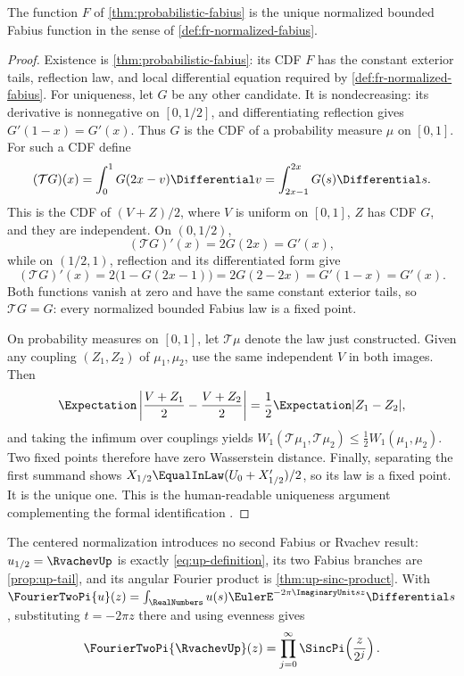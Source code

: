\begin{theorem}
\label{thm:fr-fabius-identification}
The function \(F\) of \cref{thm:probabilistic-fabius} is the unique
normalized bounded Fabius function in the sense of
\cref{def:fr-normalized-fabius}.
\end{theorem}

\begin{proof}
Existence is \cref{thm:probabilistic-fabius}: its CDF \(F\) has the constant
exterior tails, reflection law, and local differential equation required by
\cref{def:fr-normalized-fabius}.  For uniqueness, let \(G\) be any other
candidate.  It is nondecreasing: its
derivative is nonnegative on \([0,1/2]\), and differentiating reflection gives
\(G'(1-x)=G'(x)\).  Thus \(G\) is the CDF of a probability measure \(\mu\)
on \([0,1]\).  For such a CDF define
\[
 (\mathcal TG)(x)=\int_0^1G(2x-v)\Differential v
 =\int_{2x-1}^{2x}G(s)\Differential s.
\]
This is the CDF of \((V+Z)/2\), where \(V\) is uniform on \([0,1]\),
\(Z\) has CDF \(G\), and they are independent.  On \((0,1/2)\),
\[
 (\mathcal TG)'(x)=2G(2x)=G'(x),
\]
while on \((1/2,1)\), reflection and its differentiated form give
\[
 (\mathcal TG)'(x)=2\bigl(1-G(2x-1)\bigr)
 =2G(2-2x)=G'(1-x)=G'(x).
\]
Both functions vanish at zero and have the same constant exterior tails, so
\(\mathcal TG=G\): every normalized bounded Fabius law is a fixed point.

On probability measures on \([0,1]\), let \(\mathcal T\mu\) denote the law
just constructed.  Given any coupling \((Z_1,Z_2)\) of \(\mu_1,\mu_2\), use
the same independent \(V\) in both images.  Then
\[
 \Expectation\left|\frac{V+Z_1}{2}-\frac{V+Z_2}{2}\right|
 =\frac12\Expectation|Z_1-Z_2|,
\]
and taking the infimum over couplings yields
\(W_1(\mathcal T\mu_1,\mathcal T\mu_2)
 \le\tfrac12W_1(\mu_1,\mu_2)\).  Two fixed points therefore have zero
Wasserstein distance.  Finally, separating the first summand shows
\(X_{1/2}\EqualInLaw(U_0+X_{1/2}')/2\), so its law is a fixed point.  It is
the unique one.  This is the human-readable uniqueness argument complementing
the formal identification
.
\end{proof}

The centered normalization introduces no second Fabius or Rvachev result:
\(u_{1/2}=\RvachevUp\) is exactly \cref{eq:up-definition}, its two Fabius
branches are \cref{prop:up-tail}, and its angular Fourier product is
\cref{thm:up-sinc-product}.  With
\(\FourierTwoPi{u}(z)=\int_\RealNumbers
u(s)\EulerE^{-2\pi\ImaginaryUnit sz}\Differential s\), substituting
\(t=-2\pi z\) there and using evenness gives
\[
 \FourierTwoPi{\RvachevUp}(z)
 =\prod_{j=0}^{\infty}\SincPi\!\left(\frac{z}{2^j}\right).
\]

